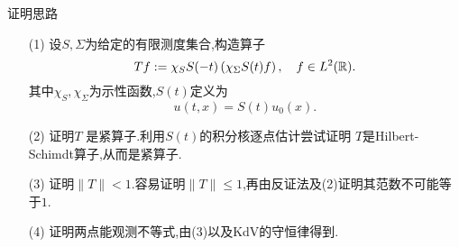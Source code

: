 \begin{frame}[t]{证明思路}

\begin{enumerate}
  \item [(1)] 设$S,\Sigma$为给定的有限测度集合,构造算子
    \begin{equation}
      Tf:=\chi_{S} S(-t)\left( \chi_{\Sigma}S(t)f \right),\quad f\in L^2(\mathbb{R}). 
    \end{equation}
    其中$\chi_S,\chi_\Sigma$为示性函数,$S(t)$定义为
   \[
     u(t,x)=S(t)u_0(x).
  \] 
\item [(2)] 证明$T$ 是紧算子.利用$S(t)$的积分核逐点估计尝试证明 $T$是Hilbert-Schimdt算子,从而是紧算子.
\item [(3)] 证明$\|T\|<1$.容易证明$\|T\|\le 1$,再由反证法及(2)证明其范数不可能等于$1$.
\item [(4)]  证明两点能观测不等式,由(3)以及KdV的守恒律得到.
\end{enumerate} 
\end{frame}
\iffalse
\begin{frame}[t]
  The strategy to prove (\ref{7}) is to construct the operator
  \begin{equation}\label{8}
    Tf := \chi_{S}S(-t)\left( \chi_{\Sigma}S(t)f \right).  
  \end{equation}
  and claim that $T$ is a compact operator and $\|T\|<1$.

 \begin{equation}
   Tf(x)=\int \chi_{S}(x)\left( \int E(-t,x-w)\chi_\Sigma(w) E(t,w-y)\,\mathrm{d}w \right) f(y)\,\mathrm{d}y.
 \end{equation}
 Define $K(x,y)=\chi_S(x)\int E(-t,x-w)\chi_{\Sigma}(w)E(t,w-y)\,\mathrm{d}w $. Then 
\begin{equation}
  Tf(x)= \int K(x,y)f(y)\,\mathrm{d}y.
\end{equation}

\end{frame}
\fi



